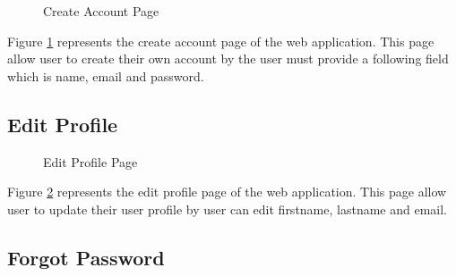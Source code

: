 \documentclass[12pt,oneside,openright,a4paper]{cpe-english-project}
\begin{document}
\begin{figure}[!h]
\centering
{}
\caption{Create Account Page}\label{fig:create-acc}
\end{figure}

Figure \ref{fig:create-acc} represents the create account page of the web application. This page allow user to create their own account by the user must provide a following field which is name, email and password.

\subsection{Edit Profile}

\begin{figure}[!h]
\centering
{}
\caption{Edit Profile Page}\label{fig:edit-profile}
\end{figure}

Figure \ref{fig:edit-profile} represents the edit profile page of the web application. This page allow user to update their user profile
by user can edit firstname, lastname and email.

\subsection{Forgot Password}
\end{document}
